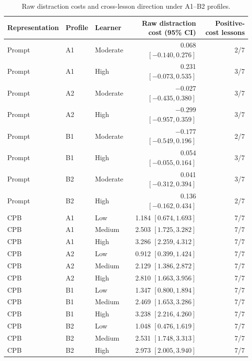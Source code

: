 \begin{table}[H]
\centering
\caption{Raw distraction costs and cross-lesson direction under A1--B2 profiles.}
\label{tab:appendix-study3-distraction-costs}
\scriptsize
\setlength{\tabcolsep}{4pt}
\renewcommand{\arraystretch}{1.08}
\begin{tabular*}{0.92\textwidth}{@{\extracolsep{\fill}}lllrr@{}}
\toprule
\textbf{Representation} & \textbf{Profile} & \textbf{Learner} & \textbf{Raw distraction cost (95\% CI)} & \textbf{Positive-cost lessons} \\
\midrule
Prompt & A1 & Moderate & 0.068 $[-0.140,0.276]$ & 2/7 \\
Prompt & A1 & High & 0.231 $[-0.073,0.535]$ & 3/7 \\
Prompt & A2 & Moderate & $-0.027$ $[-0.435,0.380]$ & 3/7 \\
Prompt & A2 & High & $-0.299$ $[-0.957,0.359]$ & 3/7 \\
Prompt & B1 & Moderate & $-0.177$ $[-0.549,0.196]$ & 2/7 \\
Prompt & B1 & High & 0.054 $[-0.055,0.164]$ & 3/7 \\
Prompt & B2 & Moderate & 0.041 $[-0.312,0.394]$ & 3/7 \\
Prompt & B2 & High & 0.136 $[-0.162,0.434]$ & 2/7 \\
CPB & A1 & Low & 1.184 $[0.674,1.693]$ & 7/7 \\
CPB & A1 & Medium & 2.503 $[1.725,3.282]$ & 7/7 \\
CPB & A1 & High & 3.286 $[2.259,4.312]$ & 7/7 \\
CPB & A2 & Low & 0.912 $[0.399,1.424]$ & 7/7 \\
CPB & A2 & Medium & 2.129 $[1.386,2.872]$ & 7/7 \\
CPB & A2 & High & 2.810 $[1.663,3.956]$ & 7/7 \\
CPB & B1 & Low & 1.347 $[0.800,1.894]$ & 7/7 \\
CPB & B1 & Medium & 2.469 $[1.653,3.286]$ & 7/7 \\
CPB & B1 & High & 3.238 $[2.216,4.260]$ & 7/7 \\
CPB & B2 & Low & 1.048 $[0.476,1.619]$ & 7/7 \\
CPB & B2 & Medium & 2.531 $[1.748,3.313]$ & 7/7 \\
CPB & B2 & High & 2.973 $[2.005,3.940]$ & 7/7 \\
\bottomrule
\end{tabular*}
\end{table}

